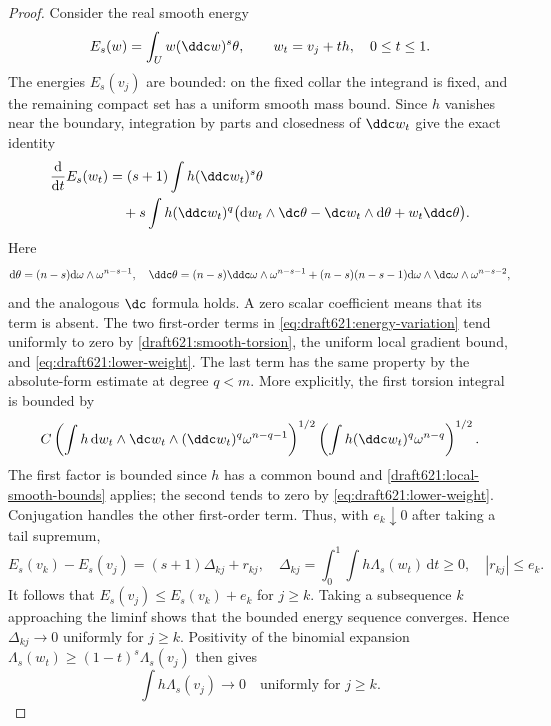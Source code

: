 \begin{proof}
Consider the real smooth energy
\[
 E_s(w)=\int_U w(\ddc w)^s\theta,
 \qquad w_t=v_j+t h,\quad0\leq t\leq1.
\]
The energies $E_s(v_j)$ are bounded: on the fixed collar the
integrand is fixed, and the remaining compact set has a uniform
smooth mass bound. Since $h$ vanishes near the boundary,
integration by parts and closedness of $\ddc w_t$ give the exact
identity
\begin{equation}\label{eq:draft621:energy-variation}
 \begin{split}
 \frac{\mathrm d}{\mathrm dt}E_s(w_t)
  &=(s+1)\int h(\ddc w_t)^s\theta\\
  &\quad+s\int h(\ddc w_t)^q
       \bigl(\mathrm dw_t\wedge\dc\theta
           -\dc w_t\wedge\mathrm d\theta+w_t\ddc\theta\bigr).
 \end{split}
\end{equation}
Here
\[
 \mathrm d\theta=(n-s)\mathrm d\omega\wedge\omega^{n-s-1},
 \quad
 \ddc\theta=(n-s)\ddc\omega\wedge\omega^{n-s-1}
 +(n-s)(n-s-1)\mathrm d\omega\wedge\dc\omega
                                           \wedge\omega^{n-s-2},
\]
and the analogous $\dc$ formula holds. A zero scalar coefficient
means that its term is absent. The two first-order terms in
\eqref{eq:draft621:energy-variation} tend uniformly to zero by
\cref{draft621:smooth-torsion}, the uniform local gradient bound,
and \eqref{eq:draft621:lower-weight}. The last term has the same
property by the absolute-form estimate at degree $q<m$.
More explicitly, the first torsion integral is bounded by
\[
 C\left(\int h\,\mathrm dw_t\wedge\dc w_t
                     \wedge(\ddc w_t)^q\omega^{n-q-1}\right)^{1/2}
   \left(\int h(\ddc w_t)^q\omega^{n-q}\right)^{1/2}.
\]
The first factor is bounded since $h$ has a common bound and
\cref{draft621:local-smooth-bounds} applies; the second tends to
zero by \eqref{eq:draft621:lower-weight}. Conjugation handles the
other first-order term.
Thus, with $e_k\downarrow0$ after taking a tail supremum,
\[
 E_s(v_k)-E_s(v_j)=(s+1)\Delta_{kj}+r_{kj},
 \quad
 \Delta_{kj}=\int_0^1\int h\Lambda_s(w_t)\,\mathrm dt\geq0,
 \quad |r_{kj}|\leq e_k.
\]
It follows that $E_s(v_j)\leq E_s(v_k)+e_k$ for $j\geq k$.
Taking a subsequence $k$ approaching the liminf shows that the
bounded energy sequence converges. Hence $\Delta_{kj}\to0$
uniformly for $j\geq k$. Positivity of the binomial expansion
$\Lambda_s(w_t)\geq(1-t)^s \Lambda_s(v_j)$ then gives
\begin{equation}\label{eq:draft621:self-weight}
 \int h\Lambda_s(v_j)\longrightarrow0
                         \quad\text{uniformly for }j\geq k.
\end{equation}


\end{proof}
